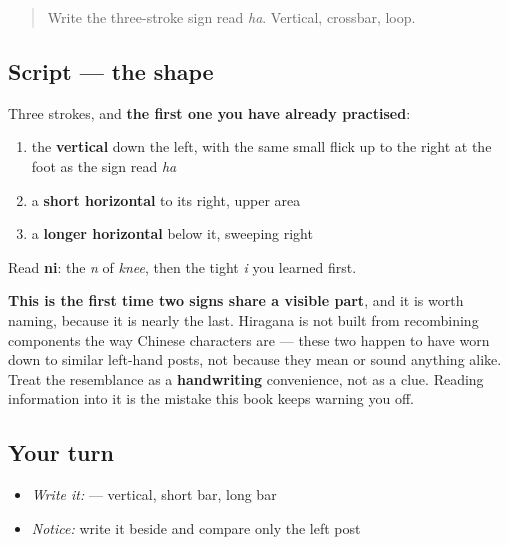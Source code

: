 \label{lesson:JA-W01-ni}



\begin{quote}
Write the three-stroke sign read \emph{ha}. Vertical, crossbar, loop.
\end{quote}

\subsection*{Script — the shape}

\begin{quote}
\end{quote}

Three strokes, and \textbf{the first one you have already practised}:

\begin{enumerate}
\raggedright
  \item the \textbf{vertical} down the left, with the same small flick up to the right at the foot as the sign read \emph{ha}
  \item a \textbf{short horizontal} to its right, upper area
  \item a \textbf{longer horizontal} below it, sweeping right
\end{enumerate}

Read \textbf{ni}: the \emph{n} of \emph{knee}, then the tight \emph{i} you learned first.

\textbf{This is the first time two signs share a visible part}, and it is worth naming, because it is nearly the last. Hiragana is not built from recombining components the way Chinese characters are — these two happen to have worn down to similar left-hand posts, not because they mean or sound anything alike. Treat the resemblance as a \textbf{handwriting} convenience, not as a clue. Reading information into it is the mistake this book keeps warning you off.

\subsection*{Your turn}
\begin{itemize}
\raggedright
  \item \emph{Write it:}  — vertical, short bar, long bar
  \item \emph{Notice:} write it beside  and compare only the left post
\end{itemize}


